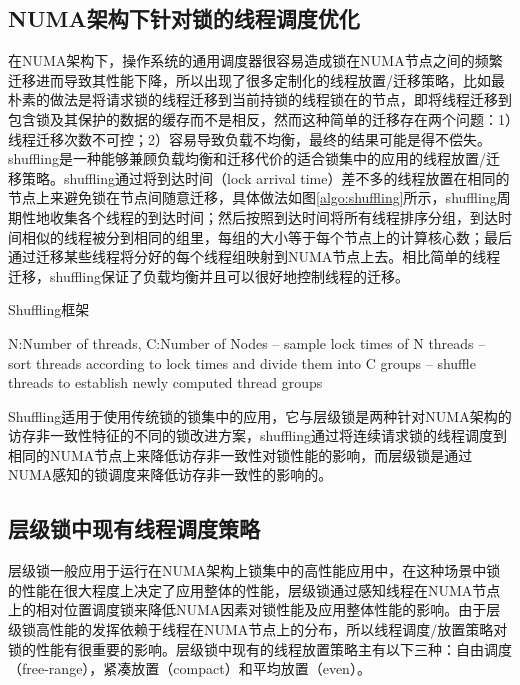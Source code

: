 \subsection{NUMA架构下针对锁的线程调度优化}
在NUMA架构下，操作系统的通用调度器很容易造成锁在NUMA节点之间的频繁迁移进而导致其性能下降，所以出现了很多定制化的线程放置/迁移策略，比如最朴素的做法是将请求锁的线程迁移到当前持锁的线程锁在的节点\cite{sridharan2006thread}，即将线程迁移到包含锁及其保护的数据的缓存而不是相反，然而这种简单的迁移存在两个问题：1）线程迁移次数不可控；2）容易导致负载不均衡，最终的结果可能是得不偿失。shuffling\cite{pusukuri2014shuffling}是一种能够兼顾负载均衡和迁移代价的适合锁集中的应用的线程放置/迁移策略。shuffling通过将到达时间（lock arrival time）差不多的线程放置在相同的节点上来避免锁在节点间随意迁移，具体做法如图\ref{algo:shuffling}所示，shuffling周期性地收集各个线程的到达时间；然后按照到达时间将所有线程排序分组，到达时间相似的线程被分到相同的组里，每组的大小等于每个节点上的计算核心数；最后通过迁移某些线程将分好的每个线程组映射到NUMA节点上去。相比简单的线程迁移，shuffling保证了负载均衡并且可以很好地控制线程的迁移。

\begin{algorithm}
\caption{Shuffling框架}
\label{algo:shuffling}
\begin{algorithmic}[1] %
\Require N:Number of threads, C:Number of Nodes %
\Repeat
{} -- sample lock times of N threads
     -- sort threads according to lock times and divide them 
    into C groups
     -- shuffle threads to establish newly computed thread groups
\EndIf
{}
\end{algorithmic}
\end{algorithm}

Shuffling适用于使用传统锁的锁集中的应用，它与层级锁是两种针对NUMA架构的访存非一致性特征的不同的锁改进方案，shuffling通过将连续请求锁的线程调度到相同的NUMA节点上来降低访存非一致性对锁性能的影响，而层级锁是通过NUMA感知的锁调度来降低访存非一致性的影响的。

\subsection{层级锁中现有线程调度策略}
层级锁一般应用于运行在NUMA架构上锁集中的高性能应用中，在这种场景中锁的性能在很大程度上决定了应用整体的性能，层级锁通过感知线程在NUMA节点上的相对位置调度锁来降低NUMA因素对锁性能及应用整体性能的影响。由于层级锁高性能的发挥依赖于线程在NUMA节点上的分布，所以线程调度/放置策略对锁的性能有很重要的影响\cite{guiroux2016multicore}。层级锁中现有的线程放置策略主有以下三种：自由调度（free-range），紧凑放置（compact）和平均放置（even）。

